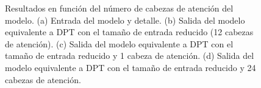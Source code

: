 \begin{figure}[!ht]
\vspace{-3.5mm}

\hspace{-3mm}
    
\vspace{-3.5mm}

\hspace{-3mm}
       
\caption{Resultados en función del número de cabezas de atención del modelo. (a) Entrada del modelo y detalle. (b) Salida del modelo equivalente a DPT con el tamaño de entrada reducido (12 cabezas de atención). (c) Salida del modelo equivalente a DPT con el tamaño de entrada reducido y 1 cabeza de atención. (d) Salida del modelo equivalente a DPT con el tamaño de entrada reducido y 24 cabezas de atención.}
    \label{fig:cualitativa-3}
    \end{figure}
\captionsetup[subfigure]{labelformat=parens}

